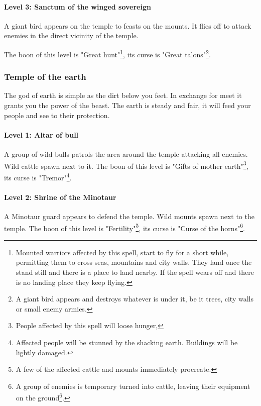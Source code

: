 \documentclass[a4paper]{article}
\begin{document}
			\paragraph{Level 3: Sanctum of the winged sovereign}
				A giant bird appears on the temple to feasts on the mounts.
				It flies off to attack enemies in the direct vicinity of the temple.

				The boon of this level is "Great hunt"\footnote{
					Mounted warriors affected by this spell,
					start to fly for a short while,
					permitting them to cross seas, mountains and city walls.
					They land once the stand still and there is a place to land nearby.
					If the spell wears off and there is no landing place they keep flying.
				},
				its curse is "Great talons"\footnote{
					A giant bird appears and destroys whatever is under it,
					be it trees, city walls or small enemy armies.
				}.

		\subsubsection{Temple of the earth}
			The god of earth is simple as the dirt below you feet.
			In exchange for meet it grants you the power of the beast.
			The earth is steady and fair, it will feed your people and see to their protection.

			\paragraph{Level 1: Altar of bull}
				A group of wild bulls patrols the area around the temple attacking
				all enemies.
				Wild cattle spawn next to it.
				The boon of this level is "Gifts of mother earth"\footnote{
					People affected by this spell will loose hunger,
				},
				its curse is "Tremor"\footnote{
					Affected people will be stunned by the shacking earth.
					Buildings will be lightly damaged.
				}.

			\paragraph{Level 2: Shrine of the Minotaur}
				A Minotaur guard appears to defend the temple.
				Wild mounts spawn next to the temple.
				The boon of this level is "Fertility"\footnote{
					A few of the affected cattle and mounts immediately procreate.
				},
				its curse is "Curse of the horns"\footnote{
					A group of enemies is temporary turned into cattle,
					leaving their equipment on the ground\footnote{
						This means once the spell ends they are still disarmed.
					}.
				}.
\end{document}
